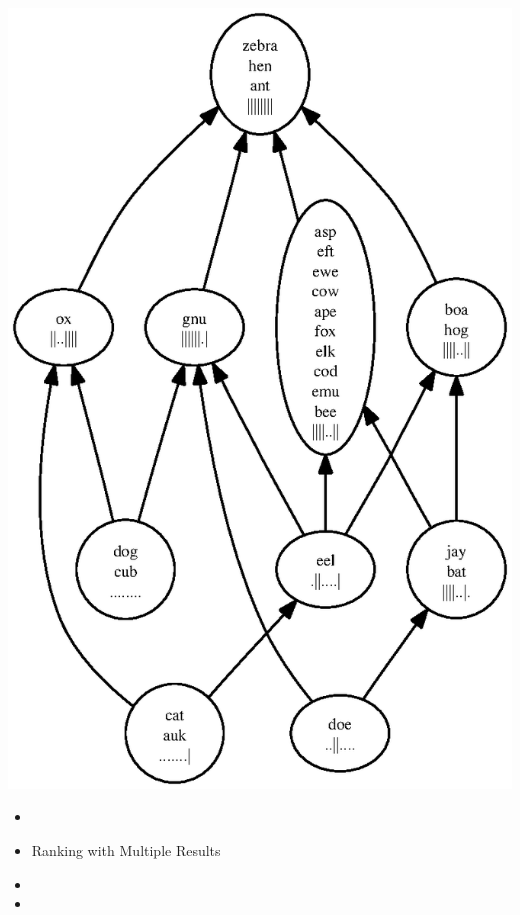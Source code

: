 \documentclass[svgnames,14pt]{beamer}
\theoremstyle{definition}
\begin{document}
\begin{frame}
\centerline{\includegraphics[height=\textheight]{rank1.ps}}
\end{frame}

\begin{frame}
\begin{itemize}
\frametitle{Overview}
\item {}
\item Ranking with Multiple Results
\item {}
\item {}
\end{itemize}
\end{frame}
\end{document}
